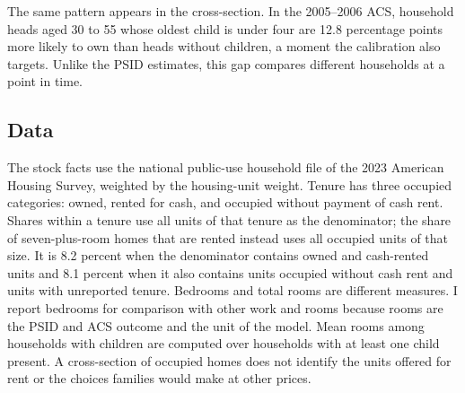 The same pattern appears in the cross-section. In the 2005--2006 ACS,
household heads aged 30 to 55 whose oldest child is under four are 12.8
percentage points more likely to own than heads without children, a moment
the calibration also targets. Unlike the PSID estimates, this gap compares
different households at a point in time.

\subsection{Data}

The stock facts use the national public-use household file of the 2023
American Housing Survey, weighted by the housing-unit weight. Tenure has three
occupied categories: owned, rented for cash, and occupied without payment of
cash rent. Shares within a tenure use all units of that tenure as the
denominator; the share of seven-plus-room homes that are rented instead uses
all occupied units of that size. It is 8.2 percent when the denominator
contains owned and cash-rented units and 8.1 percent when it also contains
units occupied without cash rent and units with unreported tenure. Bedrooms and
total rooms are different measures. I report bedrooms for comparison with
other work and rooms because rooms are the PSID and ACS outcome and the unit of
the model. Mean rooms among households with children are computed over
households with at least one child present. A cross-section of occupied homes
does not identify the units offered for rent or the choices families would
make at other prices.
